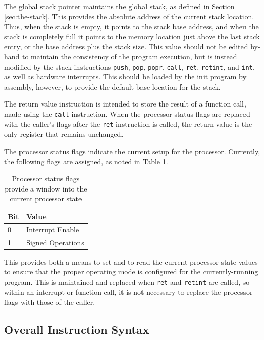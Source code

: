 \documentclass{article}
\begin{document}
The global stack pointer maintains the global stack, as defined in Section \ref{sec:the-stack}. This provides the absolute address of the current stack location. Thus, when the stack is empty, it points to the stack base address, and when the stack is completely full it points to the memory location just above the last stack entry, or the base address plus the stack size. This value should not be edited by-hand to maintain the consistency of the program execution, but is instead modified by the stack instructions \texttt{push}, \texttt{pop}, \texttt{popr}, \texttt{call}, \texttt{ret}, \texttt{retint}, and \texttt{int}, as well as hardware interrupts. This should be loaded by the init program by assembly, however, to provide the default base location for the stack.

The return value instruction is intended to store the result of a function call, made using the \texttt{call} instruction. When the processor status flags are replaced with the caller's flags after the \texttt{ret} instruction is called, the return value is the only register that remains unchanged.

The processor status flags indicate the current setup for the processor. Currently, the following flags are assigned, as noted in Table \ref{table:processor-flags}.

\begin{table}[h!]
    \centering
    \begin{tabular}{l|l}
        \hline
        Bit & Value \\
        \hline
        0 & Interrupt Enable \\
        1 & Signed Operations \\
        \hline
    \end{tabular}
    \caption{Processor status flags provide a window into the current processor state}
    \label{table:processor-flags}
\end{table}

This provides both a means to set and to read the current processor state values to ensure that the proper operating mode is configured for the currently-running program. This is maintained and replaced when \texttt{ret} and \texttt{retint} are called, so within an interrupt or function call, it is not necessary to replace the processor flags with those of the caller.

\subsection{Overall Instruction Syntax}
\end{document}
